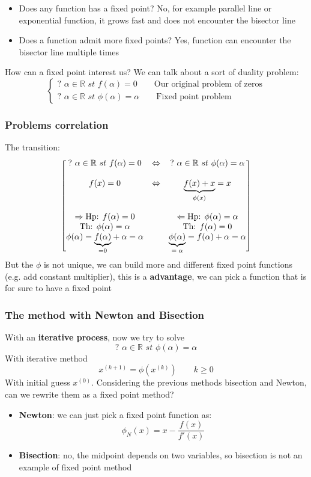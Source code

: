 \begin{itemize}
    \item Does any function has a fixed point? No, for example parallel line or exponential function, it grows fast and does not encounter the bisector line
    \item Does a function admit more fixed points? Yes, function can encounter the bisector line multiple times
\end{itemize}
How can a fixed point interest us? We can talk about a sort of duality problem:
$$
\begin{cases}
    ?\,\,\alpha\in\mathbb{R}\,\,st\,\,f(\alpha)=0\qquad\text{Our original problem of zeros}\\
    ?\,\,\alpha\in\mathbb{R}\,\,st\,\,\phi(\alpha)=\alpha\qquad\text{Fixed point problem}
\end{cases}
$$

\subsubsection{Problems correlation}
The transition:
$$
\begin{bmatrix}
    ?\,\,\alpha\in\mathbb{R}\,\,st\,\,f(\alpha)=0 & \Leftrightarrow & ?\,\,\alpha\in\mathbb{R}\,\,st\,\,\phi(\alpha)=\alpha\\
    \\
    f(x)=0 & \Leftrightarrow & \underlabel{f(x)+x}{$\phi(x)$}=x
    \\
    \\
    \Rightarrow \text{Hp: }f(\alpha)=0 & &\Leftarrow\text{Hp: }\phi(\alpha)=\alpha\\
    \text{Th: }\phi(\alpha)=\alpha & & \text{Th: }f(\alpha)=0\\
    \phi(\alpha)=\underlabel{f(\alpha)}{=0}+\alpha=\alpha & & \underlabel{\phi(\alpha)}{$=\alpha$}=f(\alpha)+\alpha=\alpha
\end{bmatrix}
$$
But the $\phi$ is not unique, we can build more and different fixed point functions (e.g. add constant multiplier), this is a \textbf{advantage}, we can pick a function that is for sure to have a fixed point

\subsubsection{The method with Newton and Bisection}
With an \textbf{iterative process}, now we try to solve
$$?\,\,\alpha\in\mathbb{R}\,\,st\,\,\phi(\alpha)=\alpha$$
With iterative method
$$x^{(k+1)}=\phi(x^{(k)})\qquad k\geq 0$$
With initial guess $x^{(0)}$. Considering the previous methods bisection and Newton, can we rewrite them as a fixed point method?
\begin{itemize}
    \item \textbf{Newton}: we can just pick a fixed point function as:
    $$\phi_N(x)=x-\frac{f(x)}{f'(x)}$$
    \item \textbf{Bisection}: no, the midpoint depends on two variables, so bisection is not an example of fixed point method
\end{itemize}


